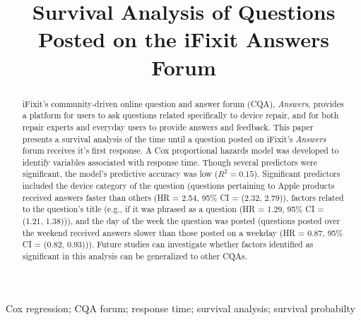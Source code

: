 \documentclass[]{interact}\usepackage[]{graphicx}\usepackage[]{color}
\begin{document}
\makeatletter
\DeclareRobustCommand\bfseries{%
  \not@math@alphabet\bfseries\mathbf
  \fontseries\bfdefault\selectfont
  \boldmath %
}
\makeatother

\makeatletter %
\@fpsep\textheight
\makeatother




\title{Survival Analysis of Questions Posted on the iFixit Answers Forum}

\author{
}

\maketitle

\begin{abstract} 
iFixit's community-driven online question and answer forum (CQA), \textit{Answers}, provides a platform for users to ask questions related specifically to device repair, and for both repair experts and everyday users to provide answers and feedback. This paper presents a survival analysis of the time until a question posted on iFixit's \textit{Answers} forum receives it's first response. A Cox proportional hazards model was developed to identify variables associated with response time. Though several predictors were significant, the model's predictive accuracy was low ($R^2 = 0.15$). Significant predictors included the device category of the question (questions pertaining to Apple products received answers faster than others (HR = 2.54, 95\% CI = (2.32, 2.79)), factors related to the question's title (e.g., if it was phrased as a question (HR = 1.29, 95\% CI = (1.21, 1.38))), and the day of the week the question was posted (questions posted over the weekend received answers slower than those posted on a weekday (HR = 0.87, 95\% CI = (0.82, 0.93))). Future studies can investigate whether factors identified as significant in this analysis can be generalized to other CQAs.
\end{abstract}

\begin{keywords}
Cox regression; CQA forum; response time; survival analysis; survival probabilty 
\end{keywords}
\end{document}
